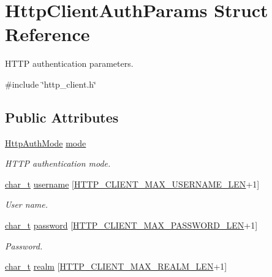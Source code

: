 \hypertarget{structHttpClientAuthParams}{}\section{Http\+Client\+Auth\+Params Struct Reference}
\label{structHttpClientAuthParams}


H\+T\+TP authentication parameters.  




{\ttfamily \#include \char`\"{}http\+\_\+client.\+h\char`\"{}}

\subsection*{Public Attributes}
\begin{DoxyCompactItemize}
\item 
\hyperlink{http__common_8h_ad435f9e57a3351beaec6fc809eff4f31}{Http\+Auth\+Mode} \hyperlink{structHttpClientAuthParams_add04fcf3f023b6d2ac1e38d6fd3ebe1e}{mode}
\begin{DoxyCompactList}\small\item\em H\+T\+TP authentication mode. \end{DoxyCompactList}\item 
\hyperlink{compiler__port_8h_a40bb5262bf908c328fbcfbe5d29d0201}{char\+\_\+t} \hyperlink{structHttpClientAuthParams_a5cadfff947b3c71dfad308cfd94fd5cd}{username} \mbox{[}\hyperlink{http__client_8h_a222fb28335a6fdc8279c0db1d2d71ef8}{H\+T\+T\+P\+\_\+\+C\+L\+I\+E\+N\+T\+\_\+\+M\+A\+X\+\_\+\+U\+S\+E\+R\+N\+A\+M\+E\+\_\+\+L\+EN}+1\mbox{]}
\begin{DoxyCompactList}\small\item\em User name. \end{DoxyCompactList}\item 
\hyperlink{compiler__port_8h_a40bb5262bf908c328fbcfbe5d29d0201}{char\+\_\+t} \hyperlink{structHttpClientAuthParams_a371e3a4a5fabb6c03cef84b43a45f3f2}{password} \mbox{[}\hyperlink{http__client_8h_a33550bf839c313dae49cff95e703b974}{H\+T\+T\+P\+\_\+\+C\+L\+I\+E\+N\+T\+\_\+\+M\+A\+X\+\_\+\+P\+A\+S\+S\+W\+O\+R\+D\+\_\+\+L\+EN}+1\mbox{]}
\begin{DoxyCompactList}\small\item\em Password. \end{DoxyCompactList}\item 
\hyperlink{compiler__port_8h_a40bb5262bf908c328fbcfbe5d29d0201}{char\+\_\+t} \hyperlink{structHttpClientAuthParams_a23f1e898b935e02ab807b69e557cb8fa}{realm} \mbox{[}\hyperlink{http__client_8h_afd0c1d75944d4aaff63ae2e8b2513072}{H\+T\+T\+P\+\_\+\+C\+L\+I\+E\+N\+T\+\_\+\+M\+A\+X\+\_\+\+R\+E\+A\+L\+M\+\_\+\+L\+EN}+1\mbox{]}

\end{DoxyCompactItemize}
